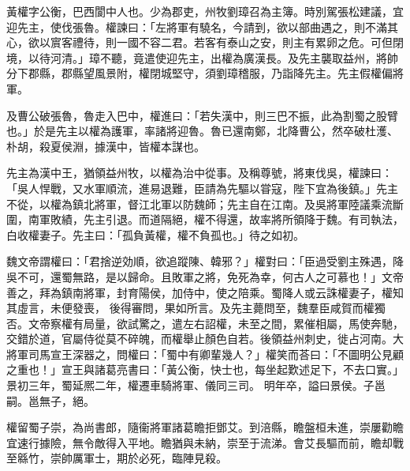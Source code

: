 \begin{pinyinscope}
 
 
 黃權字公衡，巴西閬中人也。少為郡吏，州牧劉璋召為主簿。時別駕張松建議，宜迎先主，使伐張魯。權諫曰：「左將軍有驍名，今請到，欲以部曲遇之，則不滿其心，欲以賔客禮待，則一國不容二君。若客有泰山之安，則主有累卵之危。可但閉境，以待河清。」璋不聽，竟遣使迎先主，出權為廣漢長。及先主襲取益州，將帥分下郡縣，郡縣望風景附，權閉城堅守，須劉璋稽服，乃詣降先主。先主假權偏將軍。
 
 
 及曹公破張魯，魯走入巴中，權進曰：「若失漢中，則三巴不振，此為割蜀之股臂也。」於是先主以權為護軍，率諸將迎魯。魯已還南鄭，北降曹公，然卒破杜濩、朴胡，殺夏侯淵，據漢中，皆權本謀也。
 
 
先主為漢中王，猶領益州牧，以權為治中從事。及稱尊號，將東伐吳，權諫曰：「吳人悍戰，又水軍順流，進易退難，臣請為先驅以甞寇，陛下宜為後鎮。」先主不從，以權為鎮北將軍，督江北軍以防魏師；先主自在江南。及吳將軍陸議乘流斷圍，南軍敗績，先主引退。而道隔絕，權不得還，故率將所領降于魏。有司執法，白收權妻子。先主曰：「孤負黃權，權不負孤也。」待之如初。
 
 
魏文帝謂權曰：「君捨逆効順，欲追蹤陳、韓邪？」權對曰：「臣過受劉主殊遇，降吳不可，還蜀無路，是以歸命。且敗軍之將，免死為幸，何古人之可慕也！」文帝善之，拜為鎮南將軍，封育陽侯，加侍中，使之陪乘。蜀降人或云誅權妻子，權知其虛言，未便發喪，
 後得審問，果如所言。及先主薨問至，魏羣臣咸賀而權獨否。文帝察權有局量，欲試驚之，遣左右詔權，未至之間，累催相屬，馬使奔馳，交錯於道，官屬侍從莫不碎魄，而權舉止顏色自若。後領益州刺史，徙占河南。大將軍司馬宣王深器之，問權曰：「蜀中有卿輩幾人？」權笑而荅曰：「不圖明公見顧之重也！」宣王與諸葛亮書曰：「黃公衡，快士也，每坐起歎述足下，不去口實。」景初三年，蜀延熈二年，權遷車騎將軍、儀同三司。
 明年卒，謚曰景侯。子邕嗣。邕無子，絕。
 
 
 
 
 權留蜀子崇，為尚書郎，隨衞將軍諸葛瞻拒鄧艾。到涪縣，瞻盤桓未進，崇屢勸瞻宜速行據險，無令敵得入平地。瞻猶與未納，崇至于流涕。會艾長驅而前，瞻却戰至緜竹，崇帥厲軍士，期於必死，臨陣見殺。
 
 
\end{pinyinscope}